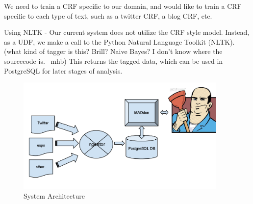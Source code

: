 \documentclass{article}
\begin{document}
\begin{enumerate}
\begin{enumerate}
    We need to train a CRF specific to our domain,
    and would like to train a CRF specific to each type of text,
    such as a twitter CRF, a blog CRF, etc.

    Using NLTK -
    Our current system does not utilize the CRF style model.
    Instead, as a UDF, we make a call to the Python Natural Language Toolkit (NLTK).
    (what kind of tagger is this? Brill? Naive Bayes? I don't know where the sourcecode is. ~mhb)
    This returns the tagged data, which can be used in PostgreSQL for later stages of analysis.


  \end{enumerate}





  \begin{figure}
    \begin{center}
      \includegraphics[width=104mm]{architecture-1.png}
      \caption{System Architecture}
      \label{fig:architecture}
    \end{center}
  \end{figure}


\end{enumerate}
\end{document}

